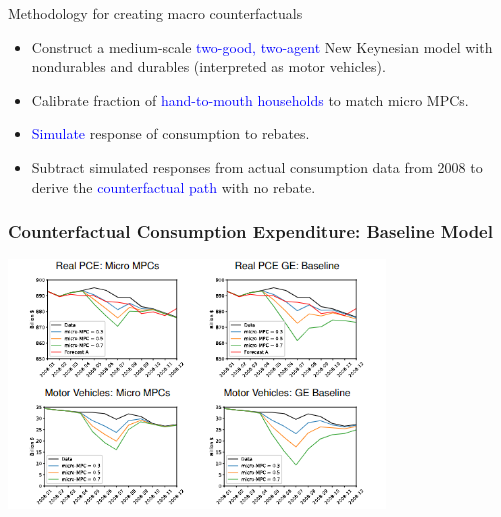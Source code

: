 \documentclass[english,xcolor=svgnames]{beamer}
\begin{document}
\begin{frame}{Methodology for creating macro counterfactuals}
\vspace{.1in}
\pause
  \begin{itemize}\itemsep=4ex
  \item Construct a medium-scale \textcolor{blue}{two-good, two-agent} New Keynesian model with nondurables and durables (interpreted as motor vehicles).
  \item Calibrate fraction of \textcolor{blue}{hand-to-mouth households} to match micro MPCs.
  \item \textcolor{blue}{Simulate} response of consumption to rebates.
  \item Subtract simulated responses from actual consumption data  from 2008 to derive the \textcolor{blue}{counterfactual path} with no rebate.
  \end{itemize}
\end{frame}

\begin{frame}[label=baselinenominal]
\frametitle{Counterfactual Consumption Expenditure: Baseline Model}

\begin{center}
\footnotesize
\centering

    \includegraphics[width=10cm]{figures/macro_counterfactual_baseline}
 \end{center} 
  \vspace{-0.5cm}
\end{frame}
\end{document}

